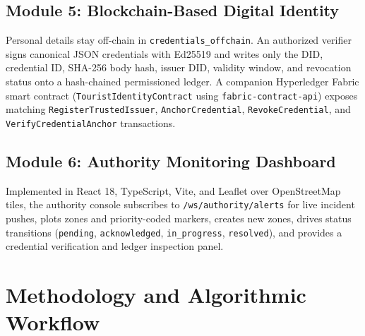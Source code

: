 \documentclass[conference]{IEEEtran}
\begin{document}
\subsection{Module 5: Blockchain-Based Digital Identity}
Personal details stay off-chain in \texttt{credentials\_offchain}. An authorized verifier signs canonical JSON credentials with Ed25519 and writes only the DID, credential ID, SHA-256 body hash, issuer DID, validity window, and revocation status onto a hash-chained permissioned ledger. A companion Hyperledger Fabric smart contract (\texttt{TouristIdentityContract} using \texttt{fabric-contract-api}) exposes matching \texttt{RegisterTrustedIssuer}, \texttt{AnchorCredential}, \texttt{RevokeCredential}, and \texttt{VerifyCredentialAnchor} transactions.

\subsection{Module 6: Authority Monitoring Dashboard}
Implemented in React 18, TypeScript, Vite, and Leaflet over OpenStreetMap tiles, the authority console subscribes to \texttt{/ws/authority/alerts} for live incident pushes, plots zones and priority-coded markers, creates new zones, drives status transitions (\texttt{pending}, \texttt{acknowledged}, \texttt{in\_progress}, \texttt{resolved}), and provides a credential verification and ledger inspection panel.

\section{Methodology and Algorithmic Workflow}
\end{document}

